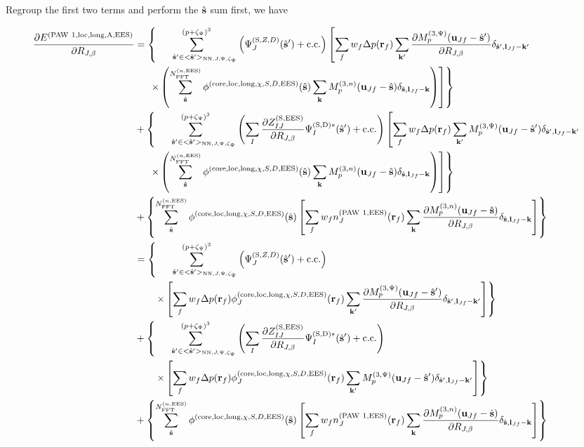 \documentclass[paper=a4, fontsize=11pt]{article} %
\numberwithin{equation}{section} %
\numberwithin{figure}{section} %
\numberwithin{table}{section} %
\newcommand{\p}{\partial}
\newcommand{\bu}{{\bf{u}}}
\newcommand{\bl}{{\bf{l}}}
\newcommand{\bk}{{\bf{k}}}
\newcommand{\bs}{{\bf{s}}}
\newcommand{\br}{{\bf{r}}}
\newcommand{\hs}{{\hat{\bf{s}}}}
\newcommand{\rS}{{\mathrm{S}}}
\newcommand{\rEES}{{\mathrm{EES}}}
\newcommand{\rcore}{{\mathrm{core}}}
\newcommand{\rNN}{{\mathrm{NN}}}
\newcommand{\rcc}{{\mathrm{c.c.}}}
\newcommand{\rlong}{{\mathrm{long}}}
\newcommand{\rP}{{\mathrm{PAW}}}
\newcommand{\rA}{{\mathrm{A}}}
\newcommand{\rD}{{\mathrm{D}}}
\newcommand{\rlo}{{\mathrm{loc}}}
\newcommand{\RJb}{{R_{J,\beta}}}
\newcommand{\NFFTnEES}{{N^{(n,\rEES)}_{\mathrm{FFT}}}}
\newcommand{\Mn}{{M_p^{(3,n)}}}
\newcommand{\Mp}{{M_p^{(3,\Psi)}}}
\newcommand{\pzp}{{(p+\zeta_{\Psi})^3}}
\newcommand{\hspJp}{{<\hs'>_{\rNN,J,\Psi,\zeta_\Psi}}}
\newcommand{\hspinJp}{{\ \ \ \ \ \hs'  \in  \hspJp}}
\begin{document}
Regroup the first two terms and perform the $\hs$ sum first, we have

\begin{equation} \label{eq:dEloclongAdR}
\begin{split}
\frac{\p E^{(\rP\ 1,\rlo,\rlong,\rA,\rEES)}}{\p \RJb}
&= \left\{\sum_{\hspinJp}^{\pzp} \left(\Psi_J^{(\rS,Z,D)}(\hat \bs')+ \rcc\right) \left[ \sum_f w_f  \Delta p(\br_f) \sum_{\bk'} \frac{\p \Mp(\bu_{Jf}-\hat \bs')}{\p \RJb}\delta_{\hat \bs',\bl_{Jf}-\bk'} \right. \right. \\ 
&\ \ \ \ \left. \left. \times \left(\sum_{\hat \bs}^{\NFFTnEES} \phi^{(\rcore,\rlo,\rlong,\chi,S,D,\rEES)}(\hs)  \sum_{\bk}  \Mn(\bu_{Jf}-\hat \bs)\delta_{\hat \bs,\bl_{Jf}-\bk}\right) \right]\right\}\\
&+ \left\{ \sum_{\hspinJp}^{\pzp}\left(\sum_I \frac{\p Z_{IJ}^{(\rS,\rEES)}}{\p \RJb}\Psi_I^{(\rS,\rD)*}(\hat \bs')+ \rcc\right) \left[ \sum_f w_f  \Delta p(\br_f) \sum_{\bk'} \Mp(\bu_{Jf}-\hat \bs')\delta_{\hat \bs',\bl_{Jf}-\bk'} \right. \right. \\ 
&\ \ \ \ \left. \left. \times \left(\sum_{\hat \bs}^{\NFFTnEES} \phi^{(\rcore,\rlo,\rlong,\chi,S,D,\rEES)}(\hs)  \sum_{\bk}  \Mn(\bu_{Jf}-\hat \bs)\delta_{\hat \bs,\bl_{Jf}-\bk}\right) \right] \right\}\\
&+ \left\{\sum_{\hat \bs}^{\NFFTnEES} \phi^{(\rcore,\rlo,\rlong,\chi,S,D,\rEES)}(\hs) \left[\sum_f w_f  n_J^{(\rP\ 1,\rEES)}(\br_f) \sum_{\bk}  \frac{\p \Mn(\bu_{Jf}-\hat \bs)}{\p \RJb}\delta_{\hat \bs,\bl_{Jf}-\bk}\right] \right\}\\
&= \left\{\sum_{\hspinJp}^{\pzp} \left(\Psi_J^{(\rS,Z,D)}(\hat \bs')+ \rcc\right) \right. \\
&\ \ \ \ \ \ \left. \times \left[ \sum_f w_f  \Delta p(\br_f) \phi_J^{(\rcore,\rlo,\rlong,\chi,S,D,\rEES)}(\br_f)\sum_{\bk'} \frac{\p \Mp(\bu_{Jf}-\hat \bs')}{\p \RJb}\delta_{\hat \bs',\bl_{Jf}-\bk'}\right]\right\} \\
&+ \left\{\sum_{\hspinJp}^{\pzp} \left(\sum_I \frac{\p Z_{IJ}^{(\rS,\rEES)}}{\p \RJb}\Psi_I^{(\rS,\rD)*}(\hat \bs')+ \rcc\right)\right. \\
&\ \ \ \ \ \ \left. \times \left[ \sum_f w_f  \Delta p(\br_f) \phi_J^{(\rcore,\rlo,\rlong,\chi,S,D,\rEES)}(\br_f)\sum_{\bk'} \Mp(\bu_{Jf}-\hat \bs')\delta_{\hat \bs',\bl_{Jf}-\bk'}\right] \right\}\\
&+ \left\{\sum_{\hat \bs}^{\NFFTnEES} \phi^{(\rcore,\rlo,\rlong,\chi,S,D,\rEES)}(\hs) \left[\sum_f w_f  n_J^{(\rP\ 1,\rEES)}(\br_f) \sum_{\bk}  \frac{\p \Mn(\bu_{Jf}-\hat \bs)}{\p \RJb}\delta_{\hat \bs,\bl_{Jf}-\bk}\right] \right\}\\

\end{split}
\end{equation}
\end{document}
